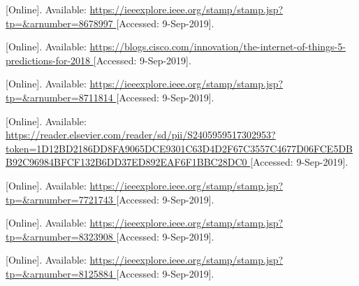 \begin{thebibliography}{9}

[Online]. Available:
\url{
https://ieeexplore.ieee.org/stamp/stamp.jsp?tp=&arnumber=8678997
}
[Accessed: 9-Sep-2019].



[Online]. Available:
\url{
https://blogs.cisco.com/innovation/the-internet-of-things-5-predictions-for-2018
}
[Accessed: 9-Sep-2019].



[Online]. Available:
\url{
https://ieeexplore.ieee.org/stamp/stamp.jsp?tp=&arnumber=8711814
}
[Accessed: 9-Sep-2019].



[Online]. Available:
\url{
https://reader.elsevier.com/reader/sd/pii/S2405959517302953?token=1D12BD2186DD8FA9065DCE9301C63D4D2F67C3557C4677D06FCE5DBB92C96984BFCF132B6DD37ED892EAF6F1BBC28DC0
}
[Accessed: 9-Sep-2019].


[Online]. Available:
\url{
https://ieeexplore.ieee.org/stamp/stamp.jsp?tp=&arnumber=7721743
}
[Accessed: 9-Sep-2019].


[Online]. Available:
\url{
https://ieeexplore.ieee.org/stamp/stamp.jsp?tp=&arnumber=8323908
}
[Accessed: 9-Sep-2019].



[Online]. Available:
\url{
https://ieeexplore.ieee.org/stamp/stamp.jsp?tp=&arnumber=8125884
}
[Accessed: 9-Sep-2019].









\end{thebibliography}
